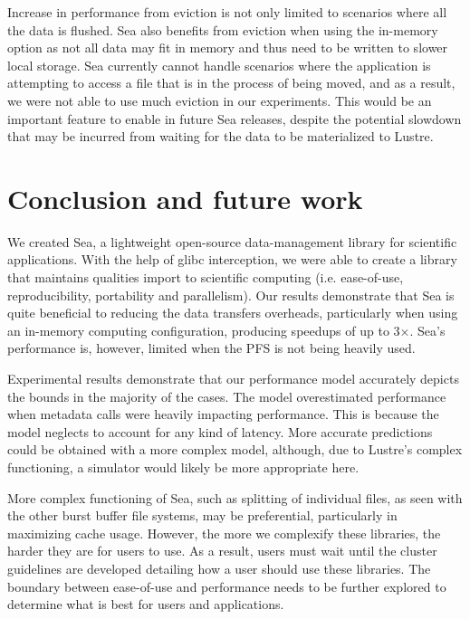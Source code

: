     Increase in performance from eviction is not only limited to scenarios where
    all the data is flushed. Sea also benefits from eviction when using the
    in-memory option as not all data may fit in memory and thus need to be
    written to slower local storage. Sea currently cannot handle scenarios where
    the application is attempting to access a file that is in the process of
    being moved, and as a result, we were not able to use much eviction in our
    experiments. This would be an important feature to enable in future Sea
    releases, despite the potential slowdown that may be incurred from waiting
    for the data to be materialized to Lustre.

\section{Conclusion and future work}

    We created Sea, a lightweight open-source data-management library for
    scientific applications. With the help of glibc interception, we were able
    to create a library that maintains qualities import to scientific computing
    (i.e. ease-of-use, reproducibility, portability and parallelism). Our
    results demonstrate that Sea is quite beneficial to reducing the data
    transfers overheads, particularly when using an in-memory computing
    configuration, producing speedups of up to 3$\times$. Sea's performance is,
    however, limited when the PFS is not being heavily used.

    Experimental results demonstrate that our performance model accurately
    depicts the bounds in the majority of the cases. The model overestimated
    performance when metadata calls were heavily impacting performance. This is
    because the model neglects to account for any kind of latency. More accurate
    predictions could be obtained with a more complex model, although, due to
    Lustre's complex functioning, a simulator would likely be more appropriate
    here.

    More complex functioning of Sea, such as splitting of individual files, as
    seen with the other burst buffer file systems, may be preferential,
    particularly in maximizing cache usage. However, the more we complexify
    these libraries, the harder they are for users to use. As a result, users
    must wait until the cluster guidelines are developed detailing how a user
    should use these libraries. The boundary between ease-of-use and performance
    needs to be further explored to determine what is best for users and
    applications.



